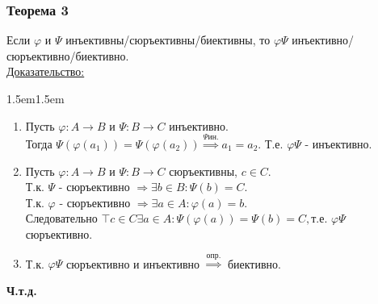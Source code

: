 \documentclass[12pt]{article}
\begin{document}
    \subsubsection*{Теорема 3}\label{th:3}
    \par\noindent
    Если $\varphi$ и $\Psi$ инъективны/сюръективны/биективны, то $\varphi \Psi$ инъективно/сюръективно/биективно.\\
    \underline{Доказательство:}
    \begin{adjustwidth}{1.5em}{1.5em}
        \begin{enumerate}
            \item Пусть $\varphi: A \rightarrow B$ и $\Psi: B \rightarrow C$ инъективно.\\
            Тогда $\Psi(\varphi(a_1))=\Psi(\varphi(a_2))\overset{\Psi \text{ин.}}{\Rightarrow} a_1=a_2.$
            Т.е. $\varphi \Psi$ - инъективно.
            
            \item Пусть $\varphi: A \rightarrow B$ и $\Psi: B \rightarrow C$ сюръективны, $c \in C.$\\
            Т.к. $\Psi$ - сюръективно $\Rightarrow \exists b \in B: \Psi(b)=C.$ \\
            Т.к. $\varphi$ - сюръективно $\Rightarrow \exists a \in A:\varphi(a)=b$.\\
            Следовательно $\intercal c \in C \exists a \in A:\Psi(\varphi(a))=\Psi(b)=C,$т.е. $\varphi \Psi$ сюръективно.
        
            \item Т.к. $\varphi \Psi$ сюръективно и инъективно $\overset{\text{опр.}}{\Rightarrow}$ биективно.
        \end{enumerate}
    \end{adjustwidth}
    \begin{center}
        \textbf{Ч.т.д.}
    \end{center}
\end{document}
